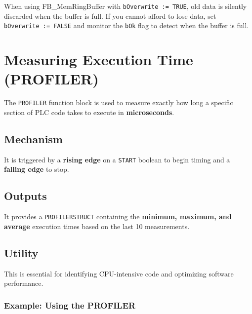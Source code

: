 \documentclass[11pt,a4paper]{article}
\begin{document}
\begin{warningbox}
When using FB\_MemRingBuffer with \texttt{bOverwrite := TRUE}, old data is silently discarded when the buffer is full. If you cannot afford to lose data, set \texttt{bOverwrite := FALSE} and monitor the \texttt{bOk} flag to detect when the buffer is full.
\end{warningbox}

\section{Measuring Execution Time (PROFILER)}

The \texttt{PROFILER} function block is used to measure exactly how long a specific section of PLC code takes to execute in \textbf{microseconds}.

\subsection{Mechanism}

It is triggered by a \textbf{rising edge} on a \texttt{START} boolean to begin timing and a \textbf{falling edge} to stop.

\subsection{Outputs}

It provides a \texttt{PROFILERSTRUCT} containing the \textbf{minimum, maximum, and average} execution times based on the last 10 measurements.

\subsection{Utility}

This is essential for identifying CPU-intensive code and optimizing software performance.

\subsubsection*{Example: Using the PROFILER}
\end{document}
